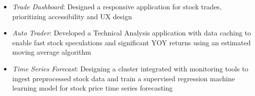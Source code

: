 \begin{itemize}
  \item \textit{Trade Dashboard}: Designed a responsive application for stock trades, prioritizing accessibility and UX design
  \item \textit{Auto Trader}: Developed a Technical Analysis application with data caching to enable fast stock speculations and significant YOY returns using an estimated moving average algorithm
  \item \textit{Time Series Forecast}: Designing a cluster integrated with monitoring tools to ingest preprocessed stock data and train a supervised regression machine learning model for stock price time series forecasting
\end{itemize}